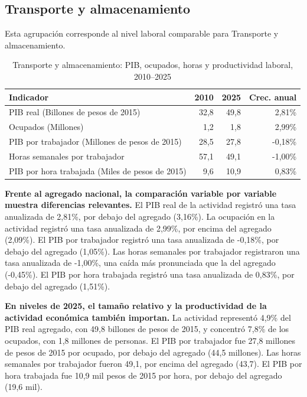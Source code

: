 \subsection{Transporte y almacenamiento}

Esta agrupación corresponde al nivel laboral comparable para Transporte y almacenamiento.

\begin{table}[H]
\centering
\caption{Transporte y almacenamiento: PIB, ocupados, horas y productividad laboral, 2010--2025}
\label{tab:agg25_h_productividad}
\small
\begin{tabular}{lrrr}
\toprule
Indicador & 2010 & 2025 & Crec. anual \\
\midrule
PIB real  (Billones de pesos de 2015) & 32,8 & 49,8 & 2,81\% \\
Ocupados (Millones) & 1,2 & 1,8 & 2,99\% \\
PIB por trabajador (Millones de pesos de 2015) & 28,5 & 27,8 & -0,18\% \\
Horas semanales por trabajador & 57,1 & 49,1 & -1,00\% \\
PIB por hora trabajada (Miles de pesos de 2015) & 9,6 & 10,9 & 0,83\% \\
\bottomrule
\end{tabular}
\end{table}

\textbf{Frente al agregado nacional, la comparación variable por variable muestra diferencias relevantes.} El PIB real de la actividad registró una tasa anualizada de 2,81\%, por debajo del agregado (3,16\%). La ocupación en la actividad registró una tasa anualizada de 2,99\%, por encima del agregado (2,09\%). El PIB por trabajador registró una tasa anualizada de -0,18\%, por debajo del agregado (1,05\%). Las horas semanales por trabajador registraron una tasa anualizada de -1,00\%, una caída más pronunciada que la del agregado (-0,45\%). El PIB por hora trabajada registró una tasa anualizada de 0,83\%, por debajo del agregado (1,51\%).

\textbf{En niveles de 2025, el tamaño relativo y la productividad de la actividad económica también importan.} La actividad representó 4,9\% del PIB real agregado, con 49,8 billones de pesos de 2015, y concentró 7,8\% de los ocupados, con 1,8 millones de personas. El PIB por trabajador fue 27,8 millones de pesos de 2015 por ocupado, por debajo del agregado (44,5 millones). Las horas semanales por trabajador fueron 49,1, por encima del agregado (43,7). El PIB por hora trabajada fue 10,9 mil pesos de 2015 por hora, por debajo del agregado (19,6 mil).


